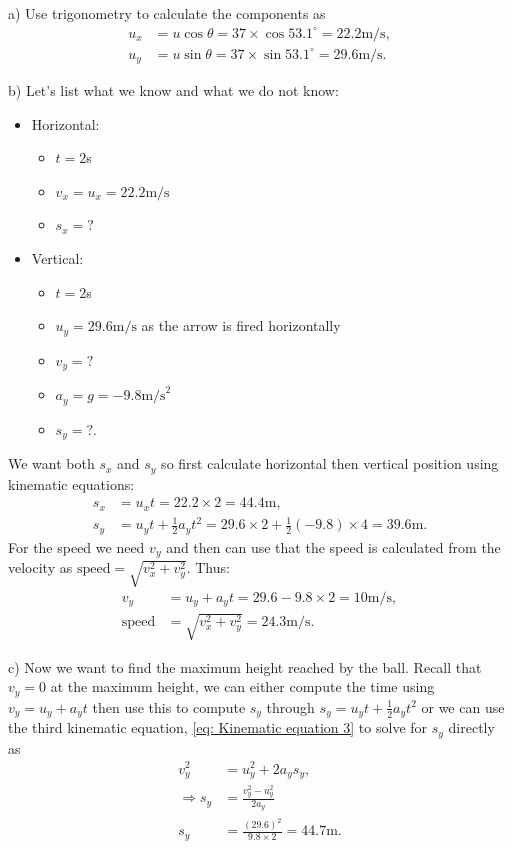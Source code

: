 \documentclass[a4paper,12pt]{book}
\begin{document}
a) Use trigonometry to calculate the components as
\begin{align*}
u_{x}&=u\cos\theta =37\times \cos53.1^{\circ}=22.2 \text{m/s},\\
u_{y}&=u\sin\theta =37\times \sin53.1^{\circ}=29.6 \text{m/s}.
\end{align*}

b) Let's list what we know and what we do not know:
\begin{itemize}
\setlength{\itemsep}{-5pt}
    \item Horizontal:
\begin{itemize}
\setlength{\itemsep}{-5pt}
    \item $t=2$s
\item $v_{x}=u_{x}=22.2\text{m/s}$ 
\item $s_{x}=?$
\end{itemize}
    \item Vertical:
\begin{itemize}
\setlength{\itemsep}{-5pt}
    \item $t=2$s
\item $u_{y}=29.6\text{m/s}$ as the arrow is fired horizontally
\item $v_{y}=?$
\item $a_{y}=g=-9.8\text{m/s}^{2}$
\item $s_{y}=?$.
\end{itemize}
\end{itemize}
We want both $s_{x}$ and $s_{y}$ so first calculate horizontal then vertical position using kinematic equations:
\begin{align*}
s_{x}&=u_{x}t=22.2\times 2=44.4\text{m},\\
s_{y}&=u_{y}t+\frac{1}{2}a_{y}t^{2}=29.6\times 2+\frac{1}{2}(-9.8)\times 4=39.6\text{m}.
\end{align*}
For the speed we need $v_{y}$ and then can use that the speed is calculated from the velocity as $\text{speed}=\sqrt{v^{2}_{x}+v^{2}_{y}}$. Thus:
\begin{align*}
v_{y}&=u_{y}+a_{y}t=29.6-9.8\times 2=10\text{m/s},\\
\text{speed}&=\sqrt{v^{2}_{x}+v^{2}_{y}}=24.3\text{m/s}.
\end{align*}

c) Now we want to find the maximum height reached by the ball. Recall that $v_{y}=0$ at the maximum height, we can either compute the time using $v_{y}=u_{y}+a_{y}t$ then use this to compute $s_{y}$ through $s_{y}=u_{y}t+\frac{1}{2}a_{y}t^{2}$ or we can use the third kinematic equation, \cref{eq: Kinematic equation 3} to solve for $s_{y}$ directly as
\begin{align*}
v^{2}_{y}&=u^{2}_{y}+2a_{y}s_{y},\\
\Rightarrow s_{y}&=\frac{v^{2}_{y}-u^{2}_{y}}{2a_{y}}\\
s_{y}&=\frac{(29.6)^{2}}{9.8\times 2}= 44.7\text{m}.
\end{align*}
\end{document}
